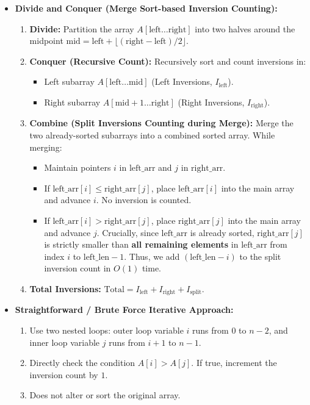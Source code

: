 \documentclass[12pt]{article}
\begin{document}
\begin{itemize}
    \item \textbf{Divide and Conquer (Merge Sort-based Inversion Counting):}
    \begin{enumerate}
        \item \textbf{Divide:} Partition the array $A[\text{left} \dots \text{right}]$ into two halves around the midpoint $\text{mid} = \text{left} + \lfloor (\text{right} - \text{left})/2 \rfloor$.
        \item \textbf{Conquer (Recursive Count):} Recursively sort and count inversions in:
        \begin{itemize}
            \item Left subarray $A[\text{left} \dots \text{mid}]$ (Left Inversions, $I_{\text{left}}$).
            \item Right subarray $A[\text{mid}+1 \dots \text{right}]$ (Right Inversions, $I_{\text{right}}$).
        \end{itemize}
        \item \textbf{Combine (Split Inversions Counting during Merge):} Merge the two already-sorted subarrays into a combined sorted array. While merging:
        \begin{itemize}
            \item Maintain pointers $i$ in $\text{left\_arr}$ and $j$ in $\text{right\_arr}$.
            \item If $\text{left\_arr}[i] \le \text{right\_arr}[j]$, place $\text{left\_arr}[i]$ into the main array and advance $i$. No inversion is counted.
            \item If $\text{left\_arr}[i] > \text{right\_arr}[j]$, place $\text{right\_arr}[j]$ into the main array and advance $j$. Crucially, since $\text{left\_arr}$ is already sorted, $\text{right\_arr}[j]$ is strictly smaller than \textbf{all remaining elements} in $\text{left\_arr}$ from index $i$ to $\text{left\_len}-1$. Thus, we add $(\text{left\_len} - i)$ to the split inversion count in $O(1)$ time.
        \end{itemize}
        \item \textbf{Total Inversions:} $\text{Total} = I_{\text{left}} + I_{\text{right}} + I_{\text{split}}$.
    \end{enumerate}

    \item \textbf{Straightforward / Brute Force Iterative Approach:}
    \begin{enumerate}
        \item Use two nested loops: outer loop variable $i$ runs from $0$ to $n-2$, and inner loop variable $j$ runs from $i+1$ to $n-1$.
        \item Directly check the condition $A[i] > A[j]$. If true, increment the inversion count by $1$.
        \item Does not alter or sort the original array.
    \end{enumerate}


\end{itemize}
\end{document}
